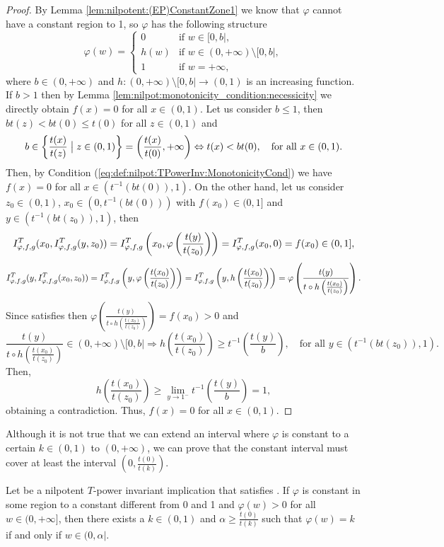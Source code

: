 \begin{proof}
	By Lemma \ref{lem:nilpotent:(EP)ConstantZone1} we know that $\varphi$ cannot have a constant region to 1, so $\varphi$ has the following structure
	$$\varphi(w)
	=
	\left\{ \begin{array}{ll}
		0 &   \text{if }   w \in [0,b|, \\
		h(w) &  \text{if }  w \in (0,+\infty) \setminus [0,b|, \\
		1 & \text{if } w=+\infty,
	\end{array}
	\right.
	$$
	where $b \in (0,+\infty)$ and $h: (0,+\infty) \setminus [0,b| \to (0,1)$ is an increasing function. If $b>1$ then by Lemma \ref{lem:nilpot:monotonicity_condition:necessicity} we directly obtain $f(x)=0$ for all $x \in (0,1)$. Let us consider $b \leq 1$, then $bt(z)<bt(0)\leq t(0)$ for all $z \in (0,1)$ and
	$$b \in \left \{ \frac{t(x)}{t(z)} \bigm| z \in (0,1)\right \} = \left(\frac{t(x)}{t(0)},+\infty \right ) \Leftrightarrow t(x)<bt(0), \quad \text{for all } x \in (0,1).$$
	Then, by Condition (\ref{eq:def:nilpot:TPowerInv:MonotonicityCond}) we have $f(x)=0$ for all $x \in (t^{-1}(bt(0)),1)$. On the other hand, let us consider $z_0 \in (0,1)$, $x_0 \in (0,t^{-1}(bt(0)))$ with $f(x_0) \in (0,1]$ and $y \in (t^{-1}(bt(z_0)),1)$, then
	$$I^T_{\varphi,f,g}(x_0,I^T_{\varphi,f,g}(y,z_0))=I^T_{\varphi,f,g} \left(x_0,\varphi \left(\frac{t(y)}{t(z_0)}\right)\right) = I^T_{\varphi,f,g}(x_0,0) =f(x_0) \in (0,1],$$
	$$I^T_{\varphi,f,g}(y,I^T_{\varphi,f,g}(x_0,z_0)) = I^T_{\varphi,f,g} \left(y,\varphi \left(\frac{t(x_0)}{t(z_0)}\right)\right) = I^T_{\varphi,f,g} \left(y,h\left(\frac{t(x_0)}{t(z_0)}\right)\right) = \varphi \left(\frac{t(y)}{t \circ h \left(\frac{t(x_0)}{t(z_0)}\right)}\right).$$
	Since \IT satisfies \EP then $\varphi \left(\frac{t(y)}{t \circ h \left(\frac{t(x_0)}{t(z_0)}\right)}\right)=f(x_0)>0$ and
	$$\frac{t(y)}{t \circ h \left(\frac{t(x_0)}{t(z_0)}\right)} \in (0,+\infty) \setminus [0,b| \Rightarrow h \left(\frac{t(x_0)}{t(z_0)}\right) \geq  t^{-1}\left(\frac{t(y)}{b} \right), \quad \text{for all } y \in (t^{-1}(bt(z_0)),1).$$
	Then,
	$$h \left(\frac{t(x_0)}{t(z_0)}\right) \geq \lim_{y \to 1^-} t^{-1} \left(\frac{t(y)}{b}\right)=1,$$
	obtaining a contradiction. Thus, $f(x)=0$ for all $x \in (0,1)$.
\end{proof}


Although it is not true that we can extend an interval where $\varphi$ is constant to a certain $k \in (0,1)$ to $(0,+\infty)$, we can prove that the constant interval must cover at least the interval $\left(0,\frac{t(0)}{t(k)}\right)$.

\begin{lemma}\label{lem:nilpotent:ConstantZoneNot01}
	Let \IT be a nilpotent $T$-power invariant implication that satisfies \EP. If $\varphi$ is constant in some region to a constant different from 0 and 1 and $\varphi(w)>0$ for all $w \in (0,+\infty]$, then there exists a $k \in (0,1)$ and $\alpha \geq \frac{t(0)}{t(k)}$ such that $\varphi(w)=k$ if and only if $w \in (0,\alpha|$.
\end{lemma}

